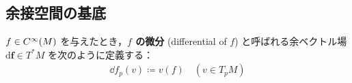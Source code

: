 \documentclass[geometry_main]{subfiles}
\begin{document}




\subsection{余接空間の基底}

$f \in C^\infty(M)$ を与えたとき，\textbf{$f$ の微分} (differential of $f$) と呼ばれる余ベクトル場 $\bm{\mathrm{d}f} \in T^* M$ を次のように定義する：
\begin{align}
	\dd{f}_p(v) \coloneqq v(f)\quad (v \in T_p M)
\end{align}
\end{document}
